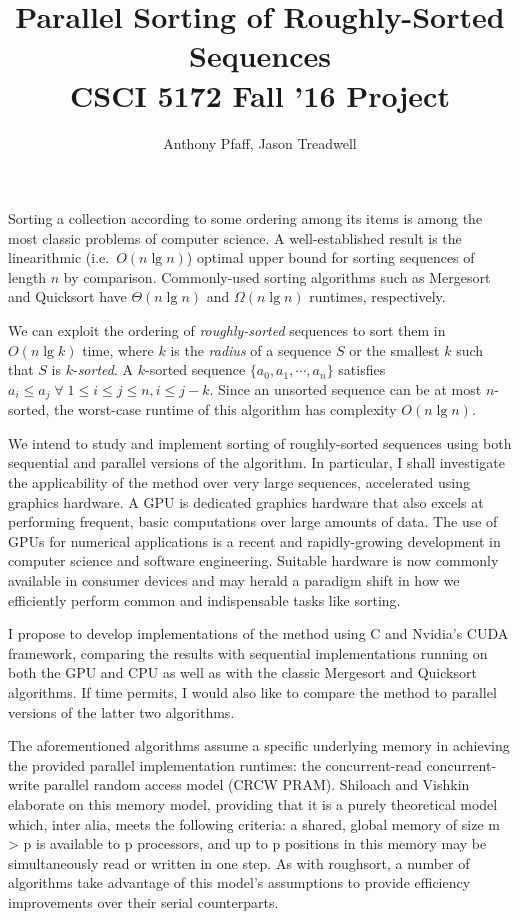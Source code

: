 \documentclass[letterpaper, 12pt]{article}
\title{Parallel Sorting of Roughly-Sorted Sequences\\CSCI 5172 Fall '16 Project}
\author{Anthony Pfaff, Jason Treadwell}
\begin{document}
\maketitle

Sorting a collection according to some ordering among its items is among the most classic problems of computer science.
A well-established result is the linearithmic  (i.e.\ $O(n \lg n)$) optimal upper bound for sorting sequences of length $n$ by
  comparison.
Commonly-used sorting algorithms such as Mergesort and Quicksort have $\Theta(n \lg n)$ and $\Omega(n \lg n)$ runtimes,
  respectively.

We can exploit the ordering of \textit{roughly-sorted} sequences to sort them in $O(n \lg k)$ time, where $k$ is the
  \textit{radius} of a sequence $S$ or the smallest $k$ such that $S$ is $k$-\textit{sorted}.\cite{altman89}
A $k$-sorted sequence $\{a_0, a_1, \cdots, a_n\}$ satisfies $a_i \leq a_j \;\forall\; 1 \leq i \leq j \leq n, i \leq j - k$.
Since an unsorted sequence can be at most $n$-sorted, the worst-case runtime of this algorithm has complexity $O(n \lg n)$.

We intend to study and implement sorting of roughly-sorted sequences using both sequential and parallel\cite{altman90} versions
  of the algorithm. In particular, I shall investigate the applicability of the method over very large sequences,
  accelerated using graphics hardware. A GPU is dedicated graphics hardware that also excels at performing frequent, basic
  computations over large amounts of data. The use of GPUs for numerical applications is a recent and rapidly-growing development
  in computer science and software engineering. Suitable hardware is now commonly available in consumer devices and may herald a
  paradigm shift in how we efficiently perform common and indispensable tasks like sorting.

I propose to develop implementations of the method using C and Nvidia's CUDA framework, comparing the results with sequential
  implementations running on both the GPU and CPU as well as with the classic Mergesort and Quicksort algorithms. If time
  permits, I would also like to compare the method to parallel versions of the latter two algorithms.

The aforementioned algorithms assume a specific underlying memory in achieving the provided parallel implementation runtimes: the concurrent-read concurrent-write parallel random access model (CRCW PRAM).  Shiloach and Vishkin elaborate on this memory model, providing that it is a purely theoretical model which, inter alia, meets the following criteria: a shared, global memory of size m > p is available to p processors, and up to p positions in this memory may be simultaneously read or written in one step\cite{Shiloach1981}.  As with roughsort, a number of algorithms take advantage of this model’s assumptions to provide efficiency improvements over their serial counterparts\cite{Shiloach1982}\cite{raj1989}.
\end{document}

